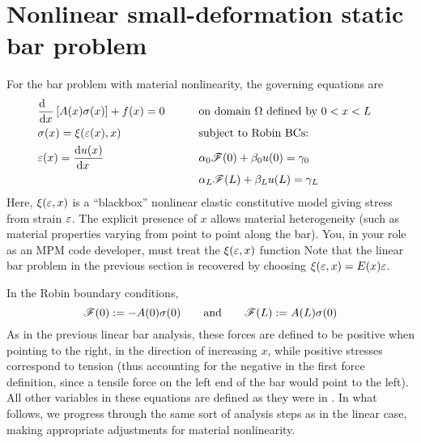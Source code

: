 \section{Nonlinear small-deformation static \oneD bar problem}
For the \oneD bar problem with material nonlinearity, the governing equations are
\begin{equation}
\begin{aligned}
  &\frac{\mathrm{d}~~}{\mathrm{d} x}\left[A(x) {\sigma}(x)\right]+f(x)=0 \qquad  &          &\text{on domain $\Omega$ defined by }0<x<L& \\
  &{\sigma}(x)=\xi({\varepsilon}(x),x)                  && \text{subject to Robin BCs: } \\
  &{\varepsilon}(x)=\frac{\mathrm{d} u(x)}{\mathrm{d} x~~~}         &&\alpha_0 \mathscr{F}(0)+\beta_0 u(0)=\gamma_0 \\
&\text{ }                                                  &&\alpha_L \mathscr{F}(L)+\beta_L u(L)=\gamma_L 
\end{aligned}
\label{eq:nonLinearBarStrongForm}
\end{equation}
Here, $\xi({\varepsilon},x)$ is a ``blackbox'' nonlinear elastic constitutive model giving stress from strain ${\varepsilon}$. The explicit presence of $x$ allows material heterogeneity (such as material properties varying from point to point along the bar).  You, in your role as an MPM code developer, must treat the $\xi({\varepsilon},x)$ function Note that the linear bar problem in the previous section is recovered by choosing $\xi({\varepsilon},x)=E(x){\varepsilon}$.

In the Robin boundary conditions, 
\begin{equation}
  \mathscr{F}(0):= -A(0){\sigma}(0)
\qquad\text{and}\qquad
  \mathscr{F}(L):=  A(L){\sigma}(0)
\label{eq:nonLinboundaryForces}
\end{equation}
As in the previous linear bar analysis, these forces are defined to be positive when pointing to the right, in the direction of increasing $x$, while positive stresses correspond to tension (thus accounting for the negative in the first force definition, since a tensile force on the left end of the bar would point to the left). 
All other variables in these equations are defined as they were in . In what follows, we progress through the same sort of analysis steps as in the linear case, making appropriate adjustments for material nonlinearity.


